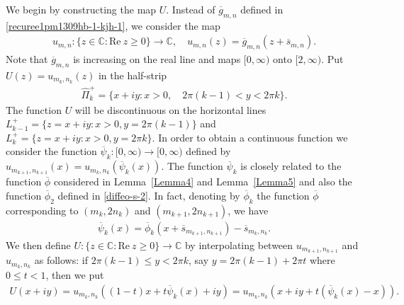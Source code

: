 \documentclass[12pt]{amsart}
\numberwithin{equation}{section}
\begin{document}
We begin by constructing the map $U$. Instead of $\overline{g}_{m,n}$ defined in \eqref{recuree1pm1309hb-1-kjh-1}, we consider the map
\begin{equation*}
\begin{split}
u_{m,n}: \{z\in\mathbb{C}: \text{Re}\ z\geq0\}\to\mathbb{C}, \quad u_{m,n}(z)=\overline{g}_{m,n}(z+\overline{s}_{m,n}).
\end{split}
\end{equation*}
Note that $\overline{g}_{m,n}$ is increasing on the real line and maps $[0,\infty)$ onto $[2,\infty)$. Put $U(z)=u_{m_k,n_k}(z)$ in the half-strip
\begin{equation*}
\begin{split}
\hat{\Pi}_k^{+}=\{x+iy: x>0, \quad  2\pi(k-1)<y<2\pi k\}.
\end{split}
\end{equation*}
The function $U$ will be discontinuous on the horizontal lines $L^{+}_{k-1}=\{z=x+iy: x>0, y=2\pi(k-1)\}$ and $L^{+}_k=\{z=x+iy: x>0, y=2\pi k\}$. In order to obtain a continuous function we consider the function $\overline{\psi}_k:[0,\infty)\to[0,\infty)$ defined by $u_{m_{k+1},n_{k+1}}(x)=u_{m_k,n_k}(\overline{\psi}_k(x))$. The function $\overline{\psi}_k$ is closely related to the function $\overline{\phi}$ considered in Lemma~\ref{Lemma4} and Lemma~\ref{Lemma5} and also the function $\overline{\phi}_2$ defined in \eqref{diffeo-s-2}. In fact, denoting by $\overline{\phi}_k$ the function $\overline{\phi}$ corresponding to $(m_k,2n_k)$ and $(m_{k+1},2n_{k+1})$, we have
\begin{equation}\label{recuree1-main eqiqu-uy-1}
\begin{split}
\overline{\psi}_k(x)=\overline{\phi}_k(x+\overline{s}_{m_{k+1},n_{k+1}})-\overline{s}_{m_{k},n_{k}}.
\end{split}
\end{equation}
We then define $U:\{z\in\mathbb{C}: \text{Re}\ z\geq0\}\to \mathbb{C}$ by interpolating between $u_{m_{k+1},n_{k+1}}$ and $u_{m_{k},n_{k}}$ as follows: if $2\pi (k-1)\leq y<2\pi k$, say $y=2\pi (k-1)+2\pi t$ where $0\leq t<1$, then we put
\begin{equation*}
\begin{split}
U(x+iy)=u_{m_{k},n_{k}}((1-t)x+t\overline{\psi}_k(x)+iy)=u_{m_{k},n_{k}}(x+iy+t(\overline{\psi}_k(x)-x)).
\end{split}
\end{equation*}
\end{document}
